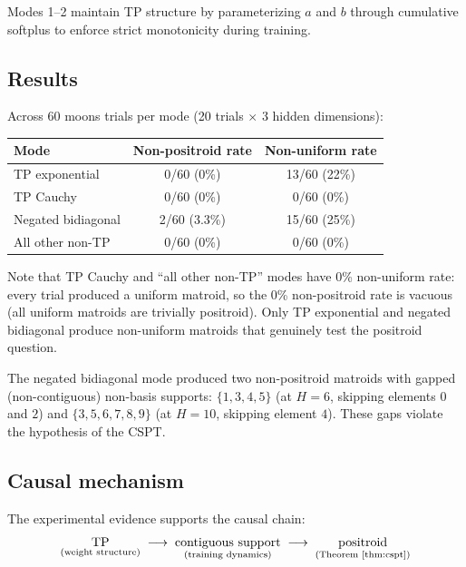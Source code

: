 \documentclass[11pt]{article}
\theoremstyle{definition}
\theoremstyle{remark}
\begin{document}
Modes 1--2 maintain TP structure by parameterizing $a$ and $b$
through cumulative softplus to enforce strict monotonicity during
training.

\subsection{Results}\label{sec:tp-results}

Across 60 moons trials per mode (20 trials $\times$ 3 hidden
dimensions):

\begin{center}
\begin{tabular}{lcc}
  \toprule
  \textbf{Mode} & \textbf{Non-positroid rate} & \textbf{Non-uniform rate} \\
  \midrule
  TP exponential & 0/60 (0\%) & 13/60 (22\%) \\
  TP Cauchy & 0/60 (0\%) & 0/60 (0\%) \\
  Negated bidiagonal & 2/60 (3.3\%) & 15/60 (25\%) \\
  All other non-TP & 0/60 (0\%) & 0/60 (0\%) \\
  \bottomrule
\end{tabular}
\end{center}

\noindent
Note that TP Cauchy and ``all other non-TP'' modes have 0\%
non-uniform rate: every trial produced a uniform matroid, so the 0\%
non-positroid rate is vacuous (all uniform matroids are trivially
positroid).  Only TP exponential and negated bidiagonal produce
non-uniform matroids that genuinely test the positroid question.

The negated bidiagonal mode produced two non-positroid matroids with
gapped (non-contiguous) non-basis supports: $\{1,3,4,5\}$ (at $H=6$,
skipping elements $0$ and $2$) and $\{3,5,6,7,8,9\}$ (at $H=10$,
skipping element $4$).  These gaps violate the hypothesis of the
CSPT.

\subsection{Causal mechanism}\label{sec:causal}

The experimental evidence supports the causal chain:
\begin{equation}\label{eq:causal}
  \underset{\text{(weight structure)}}{\text{TP}}
  \;\longrightarrow\;
  \underset{\text{(training dynamics)}}{\text{contiguous support}}
  \;\longrightarrow\;
  \underset{\text{(Theorem~\ref{thm:cspt})}}{\text{positroid}}
\end{equation}
\end{document}
